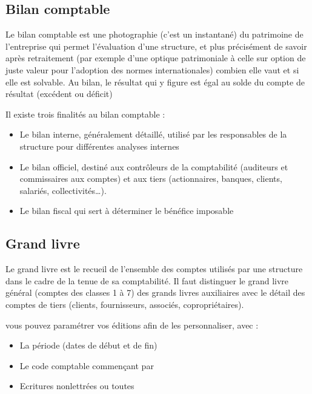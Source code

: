 \documentclass[a4paper,10pt,oneside,french]{sphinxmanual}
\begin{document}
\subsection{Bilan comptable}
\label{\detokenize{accounting/reporting:bilan-comptable}}
\sphinxAtStartPar
Le bilan comptable est une photographie (c’est un instantané) du patrimoine de l’entreprise qui permet l’évaluation d’une structure, et plus précisément de savoir après retraitement (par exemple d’une optique patrimoniale à celle sur option de juste valeur pour l’adoption des normes internationales) combien elle vaut et si elle est solvable.
Au bilan, le résultat qui y figure est égal au solde du compte de résultat (excédent ou déficit)

\sphinxAtStartPar
Il existe trois finalités au bilan comptable :
\begin{itemize}
\item {} 
\sphinxAtStartPar
Le bilan interne, généralement détaillé, utilisé par les responsables de la structure pour différentes analyses internes

\item {} 
\sphinxAtStartPar
Le bilan officiel, destiné aux contrôleurs de la comptabilité (auditeurs et commissaires aux comptes) et aux tiers (actionnaires, banques, clients, salariés, collectivités…).

\item {} 
\sphinxAtStartPar
Le bilan fiscal qui sert à déterminer le bénéfice imposable

\end{itemize}


\subsection{Grand livre}
\label{\detokenize{accounting/reporting:grand-livre}}
\sphinxAtStartPar
Le grand livre est le recueil de l’ensemble des comptes utilisés par une structure dans le cadre de la tenue de sa comptabilité.
Il faut distinguer le grand livre général (comptes des classes 1 à 7) des grands livres auxiliaires avec le détail des comptes de tiers (clients, fournisseurs, associés, copropriétaires).

\sphinxAtStartPar
vous pouvez paramétrer vos éditions afin de les personnaliser, avec :
\begin{itemize}
\item {} 
\sphinxAtStartPar
La période (dates de début et de fin)

\item {} 
\sphinxAtStartPar
Le code comptable commençant par

\item {} 
\sphinxAtStartPar
Ecritures non\sphinxhyphen{}lettrées ou toutes

\end{itemize}
\end{document}

